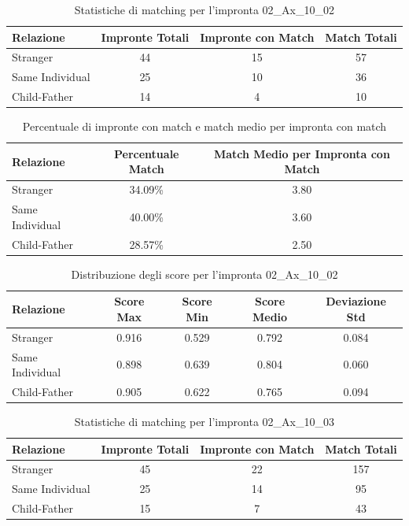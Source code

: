 \begin{table}[htbp]
\centering
\caption{Statistiche di matching per l'impronta 02\_Ax\_10\_02}
\label{tab:results_02_Ax_10_02}
\begin{tabular}{|l|c|c|c|}
\hline
\textbf{Relazione} & \textbf{Impronte Totali} & \textbf{Impronte con Match} & \textbf{Match Totali} \\
\hline
Stranger & 44 & 15 & 57 \\
\hline
Same Individual & 25 & 10 & 36 \\
\hline
Child-Father & 14 & 4 & 10 \\
\hline
\end{tabular}
\end{table}


\begin{table}[htbp]
\centering
\caption{Percentuale di impronte con match e match medio per impronta con match}
\label{tab:match_percentage_02_Ax_10_02}
\begin{tabular}{|l|c|c|}
\hline
\textbf{Relazione} & \textbf{Percentuale Match} & \textbf{Match Medio per Impronta con Match} \\
\hline
Stranger & 34.09\% & 3.80 \\
\hline
Same Individual & 40.00\% & 3.60 \\
\hline
Child-Father & 28.57\% & 2.50 \\
\hline
\end{tabular}
\end{table}


\begin{table}[htbp]
\centering
\caption{Distribuzione degli score per l'impronta 02\_Ax\_10\_02}
\label{tab:scores_02_Ax_10_02}
\begin{tabular}{|l|c|c|c|c|}
\hline
\textbf{Relazione} & \textbf{Score Max} & \textbf{Score Min} & \textbf{Score Medio} & \textbf{Deviazione Std} \\
\hline
Stranger & 0.916 & 0.529 & 0.792 & 0.084 \\
\hline
Same Individual & 0.898 & 0.639 & 0.804 & 0.060 \\
\hline
Child-Father & 0.905 & 0.622 & 0.765 & 0.094 \\
\hline
\end{tabular}
\end{table}


\begin{table}[htbp]
\centering
\caption{Statistiche di matching per l'impronta 02\_Ax\_10\_03}
\label{tab:results_02_Ax_10_03}
\begin{tabular}{|l|c|c|c|}
\hline
\textbf{Relazione} & \textbf{Impronte Totali} & \textbf{Impronte con Match} & \textbf{Match Totali} \\
\hline
Stranger & 45 & 22 & 157 \\
\hline
Same Individual & 25 & 14 & 95 \\
\hline
Child-Father & 15 & 7 & 43 \\
\hline
\end{tabular}
\end{table}


